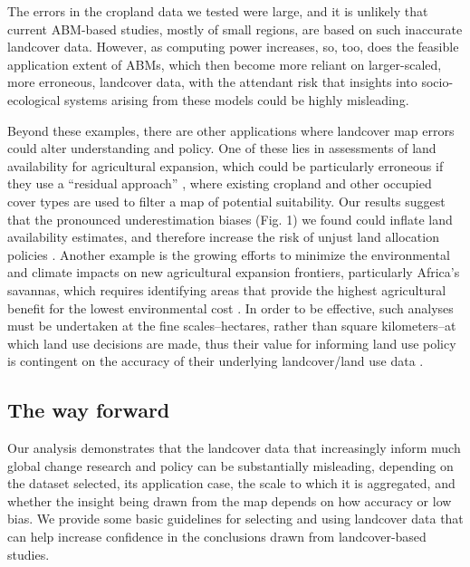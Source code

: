\documentclass{pnastwo}
\begin{document}
\begin{article}
The errors in the cropland data we tested were large, and it is unlikely that current ABM-based studies, mostly of small regions, are based on such inaccurate landcover data. However, as computing power increases, so, too, does the feasible application extent of ABMs, which then become more reliant on larger-scaled, more erroneous, landcover data, with the attendant risk that insights into socio-ecological systems arising from these models could be highly misleading.  

Beyond these examples, there are other applications where landcover map errors could alter understanding and policy. One of these lies in assessments of land availability for agricultural expansion, which could be particularly erroneous if they use a ``residual approach'' \cite{lambin_estimating_????}, where existing cropland and other occupied cover types are used to filter a map of potential suitability. Our results suggest that the pronounced underestimation biases (Fig. 1) we found could inflate land availability estimates, and therefore increase the risk of unjust land allocation policies \cite{rulli_global_2013}. Another example is the growing efforts to minimize the environmental and climate impacts on new agricultural expansion frontiers, particularly Africa's savannas, which requires identifying areas that provide the highest agricultural benefit for the lowest environmental cost \cite{searchinger_high_2015}.  In order to be effective, such analyses must be undertaken at the fine scales--hectares, rather than square kilometers--at which land use decisions are made, thus their value for informing land use policy is contingent on the accuracy of their underlying landcover/land use data \cite{searchinger_high_2015}.

\subsection{The way forward}
Our analysis demonstrates that the landcover data that increasingly inform much global change research and policy can be substantially misleading, depending on the dataset selected, its application case, the scale to which it is aggregated, and whether the insight being drawn from the map depends on how accuracy or low bias. We provide some basic guidelines for selecting and using landcover data that can help increase confidence in the conclusions drawn from landcover-based studies. 


\end{article}
\end{document}
